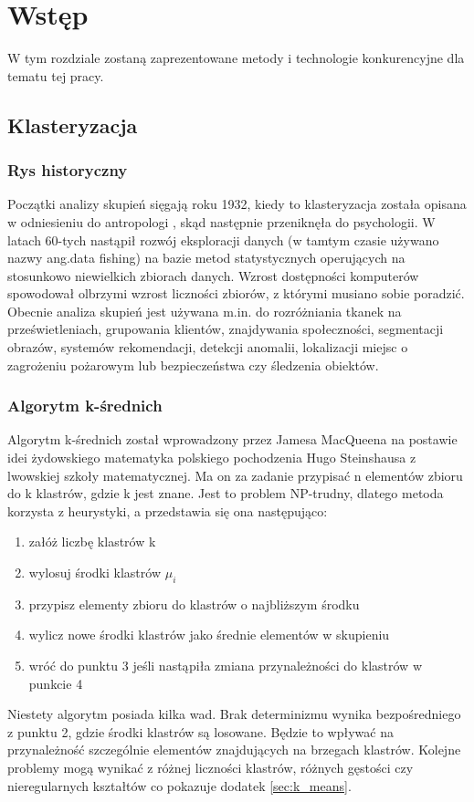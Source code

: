 \chapter{Wstęp}
\label{cha:wstep}

W tym rozdziale zostaną zaprezentowane metody i technologie konkurencyjne dla tematu tej pracy.

\section{Klasteryzacja}
\label{sec:klasteryzacja}

\subsection{Rys historyczny}
Początki analizy skupień sięgają roku 1932, kiedy to klasteryzacja została opisana w odniesieniu do antropologi \cite{Dri32}, skąd następnie przeniknęła do psychologii. W latach 60-tych nastąpił rozwój eksploracji danych (w tamtym czasie używano nazwy ang.data fishing) na bazie metod statystycznych operujących na stosunkowo niewielkich zbiorach danych. Wzrost dostępności komputerów spowodował olbrzymi wzrost liczności zbiorów, z którymi musiano sobie poradzić. Obecnie analiza skupień jest używana m.in. do rozróżniania tkanek na prześwietleniach, grupowania klientów, znajdywania społeczności, segmentacji obrazów, systemów rekomendacji, detekcji anomalii, lokalizacji miejsc o zagrożeniu pożarowym lub bezpieczeństwa czy śledzenia obiektów.

\subsection{Algorytm k-średnich}
Algorytm k-średnich został wprowadzony przez Jamesa MacQueena \cite{Mac67} na postawie idei żydowskiego matematyka polskiego pochodzenia Hugo Steinshausa z lwowskiej szkoły matematycznej.\newline
Ma on za zadanie przypisać n elementów zbioru do k klastrów, gdzie k jest znane. Jest to problem NP-trudny, dlatego metoda korzysta z heurystyki, a przedstawia się ona następująco:
\begin{enumerate}
	\item{załóż liczbę klastrów k}
	\item{wylosuj środki klastrów $\mu_i$}
	\item{przypisz elementy zbioru do klastrów o najbliższym środku}
	\item{wylicz nowe środki klastrów jako średnie elementów w skupieniu}
	\item{wróć do punktu 3 jeśli nastąpiła zmiana przynależności do klastrów w punkcie 4}
\end{enumerate}
Niestety algorytm posiada kilka wad. Brak determinizmu wynika bezpośredniego z punktu 2, gdzie środki klastrów są losowane. Będzie to wpływać na przynależność szczególnie elementów znajdujących na brzegach klastrów. Kolejne problemy mogą wynikać z różnej liczności klastrów, różnych gęstości czy nieregularnych kształtów co pokazuje dodatek \ref{sec:k_means}.

